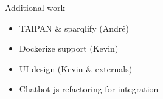 \begin{frame}{Additional work}
	\begin{itemize}
		\item TAIPAN \& sparqlify (André)
		\item Dockerize support (Kevin)
		\item UI design (Kevin \& externals)
		\item Chatbot js refactoring for integration
	\end{itemize}
\end{frame}